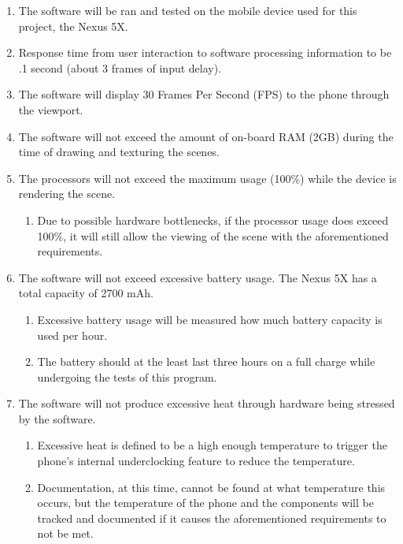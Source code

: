 \documentclass[letterpaper,10pt,titlepage,draftclsnofoot,onecolumn,compsoc,utf8,latin1]{IEEEtran}
\begin{document}
\begin{singlespace}
\begin{singlespace}
\begin{enumerate}[labelsep=2em,leftmargin=.5in]
    \item The software will be ran and tested on the mobile device used for this project, the Nexus 5X.
    \item Response time from user interaction to software processing information to be .1 second (about 3 frames of input delay).
    \item The software will display 30 Frames Per Second (FPS) to the phone through the viewport.
    \item The software will not exceed the amount of on-board RAM (2GB) during the time of drawing and texturing the scenes.
    \item The processors will not exceed the maximum usage (100\%) while the device is rendering the scene.
    \begin{enumerate}[leftmargin=*,labelindent=0pt]
        \item Due to possible hardware bottlenecks, if the processor usage does exceed 100\%, it will still allow the viewing of the scene with the aforementioned requirements.
    \end{enumerate}
    \item The software will not exceed excessive battery usage. The Nexus 5X has a total capacity of 2700 mAh.
    \begin{enumerate}[leftmargin=*,labelindent=0pt]
        \item Excessive battery usage will be measured how much battery capacity is used per hour.
        \item The battery should at the least last three hours on a full charge while undergoing the tests of this program.
    \end{enumerate}
    \item The software will not produce excessive heat through hardware being stressed by the software.
    \begin{enumerate}[leftmargin=*,labelindent=0pt]
        \item Excessive heat is defined to be a high enough temperature to trigger the phone's internal underclocking feature to reduce the temperature.
        \item Documentation, at this time, cannot be found at what temperature this occurs, but the temperature of the phone and the components will be tracked and documented if it causes the aforementioned requirements to not be met.
    \end{enumerate}
\end{enumerate}
\end{singlespace}


\end{singlespace}
\end{document}
